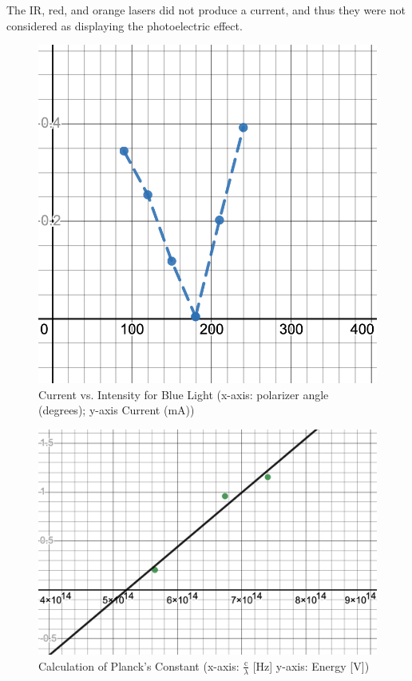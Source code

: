 \documentclass{article}[12pt]
\begin{document}
The IR, red, and orange lasers did not produce a current, and thus they were not considered as displaying the photoelectric effect.

\begin{figure}[H]
\centering
\includegraphics[scale=.4]{figures/currents.png}
\caption{Current vs. Intensity for Blue Light (x-axis: polarizer angle (degrees); y-axis Current (mA))}
\label{currents}
\end{figure}

\begin{figure}[H]
\centering
\includegraphics[scale=.4]{figures/plancks.png}
\caption{Calculation of Planck's Constant (x-axis: $ \frac{\text{c}}{\lambda } $ [Hz] y-axis: Energy [V])}
\label{plancks_anal}
\end{figure}
\end{document}
